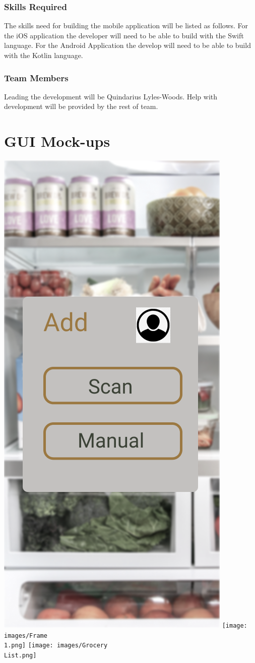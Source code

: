 \documentclass{article}
\begin{document}
\subsubsection{Skills Required}
The skills need for building the mobile application will be listed as follows.
For the iOS application the developer will need to be able to build with the Swift language.
For the Android Application the develop will need to be able to build with the Kotlin language.
\subsubsection{Team Members}
Leading the development will be Quindarius Lyles-Woods.
Help with development will be provided by the rest of team.

\section{GUI Mock-ups}
\includegraphics[height = \textwidth/2]{images/Add Items.png}
\texttt{[image: images/Frame\\ 1.png]}
\texttt{[image: images/Grocery\\ List.png]}
\end{document}
